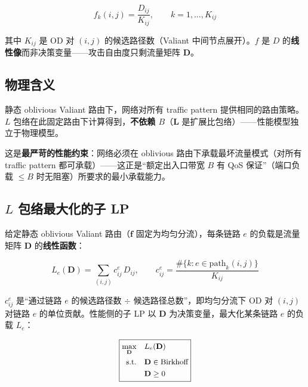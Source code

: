\documentclass[11pt]{article}
\newcommand{\bv}{\mathbf}
\begin{document}
\begin{equation}
f_k(i,j) = \frac{D_{ij}}{K_{ij}}, \qquad k = 1, \dots, K_{ij}
\end{equation}

其中 $K_{ij}$ 是 OD 对 $(i,j)$ 的候选路径数（Valiant 中间节点展开）。$f$ 是 $D$ 的\textbf{线性像}而非决策变量——攻击自由度只剩流量矩阵 $\bv{D}$。

\subsection{物理含义}

静态 oblivious Valiant 路由下，网络对所有 traffic pattern 提供相同的路由策略。$L$ 包络在此固定路由下计算得到，\textbf{不依赖 $B$}（$\bv{L}$ 是扩展比包络）——性能模型独立于物理模型。

这是\textbf{最严苛的性能约束}：网络必须在 oblivious 路由下承载最坏流量模式（对所有 traffic pattern 都可承载）——这正是“额定出入口带宽 $B$ 有 QoS 保证”（端口负载 $\le B$ 时无阻塞）所要求的最小承载能力。

\subsection{$L$ 包络最大化的子 LP}

给定静态 oblivious Valiant 路由（$\bv{f}$ 固定为均匀分流），每条链路 $e$ 的负载是流量矩阵 $\bv{D}$ 的\textbf{线性函数}：

\begin{equation}
L_e(\bv{D}) = \sum_{(i,j)} c_{ij}^{e}\,D_{ij}, \qquad
c_{ij}^{e} = \frac{\#\{k : e \in \text{path}_k(i,j)\}}{K_{ij}}
\end{equation}

$c_{ij}^{e}$ 是“通过链路 $e$ 的候选路径数 $\div$ 候选路径总数”，即均匀分流下 OD 对 $(i,j)$ 对链路 $e$ 的单位贡献。性能侧的子 LP 以 $\bv{D}$ 为决策变量，最大化某条链路 $e$ 的负载 $L_e$：

\begin{equation}
\small
\boxed{
\begin{aligned}
\max_{\bv{D}}\quad & L_e(\bv{D}) \\
\text{s.t.}\quad & \bv{D} \in \text{Birkhoff} \\
& \bv{D} \ge 0
\end{aligned}
}
\end{equation}
\end{document}
